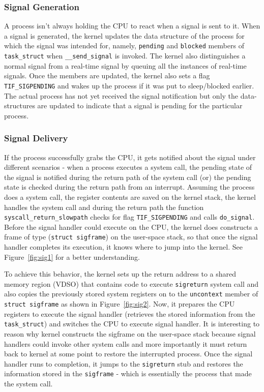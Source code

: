 \documentclass{sig-alternate-05-2015}
\begin{document}
\subsubsection{Signal Generation}
A process isn't always holding the CPU to react when a signal is sent to it. When a signal is generated, the kernel updates the data structure of the process for which the signal was intended for, namely, \texttt{pending} and \texttt{blocked} members of \texttt{task\_struct} when \texttt{\_\_send\_signal} is invoked. The kernel also distinguishes a normal signal from a real-time signal by queuing all the instances of real-time signals. Once the members are updated, the kernel also sets a flag \texttt{TIF\_SIGPENDING} and wakes up the process
if it was put to sleep/blocked earlier. The actual process has not yet received the signal notification but only the data-structures are updated to indicate that a signal is pending for the particular process.

\subsubsection{Signal Delivery}
If the process successfully grabs the CPU, it gets notified about the signal under different scenarios - when a process executes a system call, the pending state of the signal is notified during the return path of the system call (or) the pending state is checked during the return path from an interrupt. Assuming the process does a system call, the register contents are saved on the kernel stack, the kernel handles the system call and during the return path the function \texttt{syscall\_return\_slowpath} checks for flag \texttt{TIF\_SIGPENDING} and calls \texttt{do\_signal}. Before the signal handler could execute on the CPU, the kernel does constructs a frame of type (\texttt{struct sigframe}) on the user-space stack, so that once the signal handler completes its execution, it knows where to jump into the kernel. See Figure~\ref{fig:sig1} for a better understanding. 
\par To achieve this behavior, the kernel sets up the return address to a shared memory region (VDSO) that contains code to execute \texttt{sigreturn} system call and also copies the previously stored system registers on to the \texttt{uncontext} member of \texttt{struct sigframe} as shown in Figure~\ref{fig:sig2}. Now, it prepares the CPU registers to execute the signal handler (retrieves the stored information from the \texttt{task\_struct}) and switches the CPU to execute signal handler. It is interesting to reason why kernel constructs the sigframe on the user-space stack because signal handlers could invoke other system calls and more importantly it must return back to kernel at some point to restore the interrupted process. Once the signal handler runs to completion, it jumps to the \texttt{sigreturn} stub and restores the information stored in the \texttt{sigframe} - which is essentially the process that made the system call.
\end{document}
